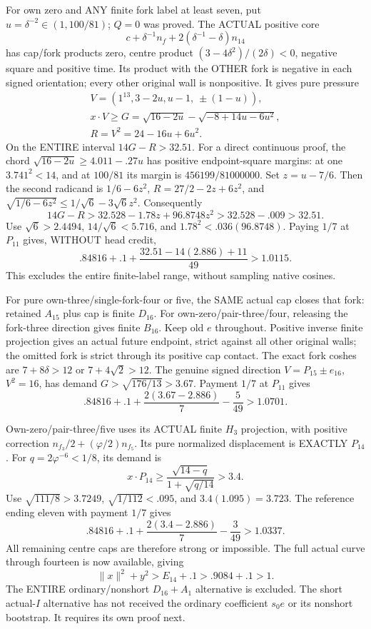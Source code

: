 \documentclass[11pt]{article}
\begin{document}
For own zero and ANY finite fork
label at least seven, put
\(u=\delta^{-2}\in(1,100/81)\);
\(Q=0\) was proved.
The ACTUAL positive core
\[
                     c+\delta^{-1}n_f+
                                     2(\delta^{-1}-\delta)n_{14}
\]
has cap/fork products zero, centre
product \((3-4\delta^2)/(2\delta)<0\),
negative square and positive time.
Its product with the OTHER fork is
negative in each signed orientation;
every other original wall is nonpositive.
It gives pure pressure
\[
 \begin{gathered}
 V=(1^{13},3-2u,u-1,\ \pm(1-u)),\\
 x\cdot V\ge G=\sqrt{16-2u}-\sqrt{-8+14u-6u^2},\\
                              R=V^2=24-16u+6u^2 .
 \end{gathered}
\]
On the ENTIRE interval \(14G-R>32.51\).
For a direct continuous proof, the chord
\(\sqrt{16-2u}\ge4.011-.27u\)
has positive endpoint-square margins:
at one \(3.741^2<14\), and at
\(100/81\) its margin is
\(456199/81000000\).
Set \(z=u-7/6\).
Then the second radicand is \(1/6-6z^2\),
\(R=27/2-2z+6z^2\), and
\(\sqrt{1/6-6z^2}\le1/\sqrt6-3\sqrt6z^2\).
Consequently
\[
 14G-R>32.528-1.78z+96.8748z^2
                     >32.528-.009>32.51 .
\]
Use \(\sqrt6>2.4494\), \(14/\sqrt6<5.716\),
and \(1.78^2<.036(96.8748)\).
Paying \(1/7\) at \(P_{11}\) gives,
WITHOUT head credit,
\[
              .84816+.1+{\frac{32.51-14(2.886)+11}{49}}
                              >1.0115 .
\]
This excludes the entire finite-label
range, without sampling native cosines.

For pure own-three/single-fork-four
or five, the SAME actual cap closes
that fork: retained \(A_{15}\) plus
cap is finite \(D_{16}\).
For own-zero/pair-three/four, releasing
the fork-three direction gives finite
\(B_{16}\).
Keep old \(e\) throughout.
Positive inverse finite projection gives
an actual future endpoint, strict against
all other original walls; the omitted
fork is strict through its positive
cap contact.
The exact fork coshes are
\(7+8\delta>12\) or \(7+4\sqrt2>12\).
The genuine signed direction
\(V=P_{15}\pm e_{16}\), \(V^2=16\),
has demand \(G>\sqrt{176/13}>3.67\).
Payment \(1/7\) at \(P_{11}\) gives
\[
                  .84816+.1+{\frac{2(3.67-2.886)}{7}}-{\frac{5}{49}}>1.0701 .
\]

Own-zero/pair-three/five uses its ACTUAL
finite \(H_3\) projection, with positive
correction \(n_{f_3}/2+(\varphi/2)n_{f_5}\).
Its pure normalized displacement is
EXACTLY \(P_{14}\).
For \(q=2\varphi^{-6}<1/8\), its demand is
\[
                  x\cdot P_{14}\ge
                  {\frac{\sqrt{14-q}}{1+\sqrt{q/14}}}>3.4 .
\]
Use \(\sqrt{111/8}>3.7249\),
\(\sqrt{1/112}<.095\), and
\(3.4(1.095)=3.723\).
The reference ending eleven with
payment \(1/7\) gives
\[
                    .84816+.1+{\frac{2(3.4-2.886)}{7}}-{\frac{3}{49}}>1.0337 .
\]
All remaining centre caps are therefore
strong or impossible.
The full actual curve through fourteen
is now available, giving
\[
                        \|x\|^2+y^2>E_{14}+.1>.9084+.1>1 .
\]
The ENTIRE ordinary/nonshort \(D_{16}+A_1\)
alternative is excluded.
The short actual-\(I\) alternative has
not received the ordinary coefficient
\(s_0e\) or its nonshort bootstrap.
It requires its own proof next.
\end{document}

